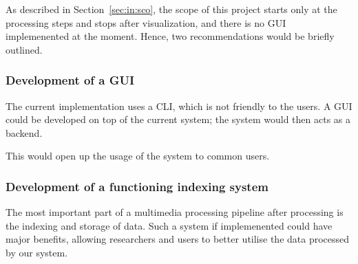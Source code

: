 As described in Section~\ref{sec:in:sco}, the scope of this project starts only at
the processing steps and stops after visualization, and there is no GUI implemenented
at the moment. Hence, two recommendations would be briefly outlined.

\subsubsection{Development of a GUI}

The current implementation uses a CLI, which is not friendly to the users. A GUI
could be developed on top of the current system; the system would then acts as a
backend.

This would open up the usage of the system to common users.

\subsubsection{Development of a functioning indexing system}

The most important part of a multimedia processing pipeline after processing is 
the indexing and storage of data. Such a system if implemenented could have major
benefits, allowing researchers and users to better utilise the data processed by
our system.
